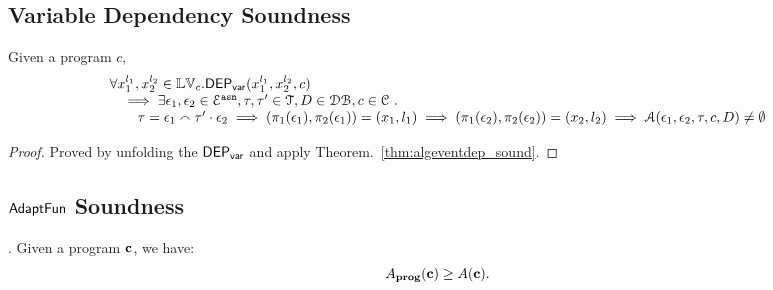 %
\subsection{Variable Dependency Soundness}
\begin{thm}
\label{thm:algvardep_sound}
Given a program ${c}$, 
\[
\begin{array}{l}
  \forall {x}_1^{l_1}, {x}_2^{l_2} \in \mathbb{LV}_{{c}}.
  \mathsf{DEP_{var}}({x}_1^{l_1}, {x}_2^{l_2}, {c})
  \\ \quad \implies \exists \mathtt{\epsilon}_1, \mathtt{\epsilon}_2 \in \mathcal{E}^{\mathtt{{asn}}}, \mathtt{\tau}, \mathtt{\tau}'  \in \mathcal{T}, D \in \mathcal{DB} , c \in \mathcal{C} ~.~
  \\ \qquad
 \mathtt{\tau} = \mathtt{\epsilon}_1 \smallfrown \mathtt{\tau}' \cdot \mathtt{\epsilon}_2
   \implies 
  (\pi_{1}{(\mathtt{\epsilon}_1)}, \pi_{2}{(\mathtt{\epsilon}_1)}) = ({x}_1, l_1)
\implies
(\pi_{1}{(\mathtt{\epsilon}_2)}, \pi_{2}{(\mathtt{\epsilon}_2)}) = ({x}_2, l_2)
\implies
  \mathcal{A}(\mathtt{\epsilon}_1, \mathtt{\epsilon}_2, \mathtt{\tau}, c, D) \neq \emptyset
\end{array}
\]
\end{thm}
\begin{proof}
Proved by unfolding the $\mathsf{DEP_{var}}$ and apply Theorem.~\ref{thm:algeventdep_sound}.
\end{proof}
%

\subsection{$\textsf{AdaptFun}$ Soundness}
{
  \begin{thm}.
  Given a program ${\boldsymbol{\mathbf{c}}}$, we have:
  \[
  A_{\bf{prog}}({\boldsymbol{\mathbf{c}}}) \geq A({\boldsymbol{\mathbf{c}}}).
  \]
  \end{thm}
}


